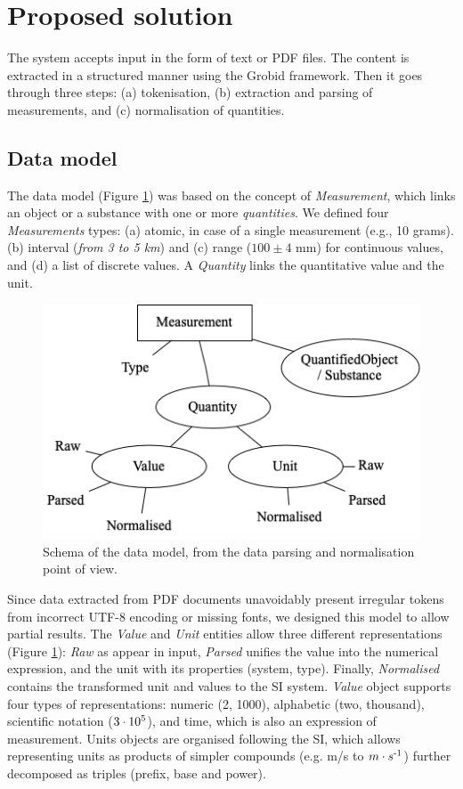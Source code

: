 \section{Proposed solution}
\label{sec:system}

The system accepts input in the form of text or PDF files. 
The content is extracted in a structured manner using the Grobid framework. 
Then it goes through three steps: (a) tokenisation, (b) extraction and parsing of measurements, and (c) normalisation of quantities.

\subsection{Data model}
\label{subsec:data-model}

The data model (Figure \ref{fig:data-model-schema-2}) was based on the concept of \textit{Measurement}, which links an object or a substance with one or more \textit{quantities}. 
We defined four \textit{Measurements} types: (a) atomic, in case of a single measurement (e.g., 10 grams). (b) interval (\textit{from 3 to 5 km}) and (c) range ($100 \pm 4$ mm) for continuous values, and (d) a list of discrete values. A \textit{Quantity} links the quantitative value and the unit. 

\label{subsub:data-model}
\begin{figure}[htbp]
  \centering
  \includegraphics[width=0.8\linewidth]{figures/quantities/schema-2.png}
  \caption{Schema of the data model, from the data parsing and normalisation point of view.}
  \label{fig:data-model-schema-2}
\end{figure}

Since data extracted from PDF documents unavoidably present irregular tokens from incorrect UTF-8 encoding or missing fonts, we designed this model to allow partial results. 
The \textit{Value} and \textit{Unit} entities allow three different representations (Figure \ref{fig:data-model-schema-2}): \textit{Raw} as appear in input, \textit{Parsed} unifies the value into the numerical expression, and the unit with its properties (system, type). Finally, \textit{Normalised} contains the transformed unit and values to the SI system. \textit{Value} object supports four types of representations: numeric (2, 1000), alphabetic (two, thousand), scientific notation ($3\cdot10\textsuperscript{5}$), and time, which is also an expression of measurement. Units objects are organised following the SI, which allows representing units as products of simpler compounds (e.g. m/s to $m \cdot s\textsuperscript{-1}$) further decomposed as triples (prefix, base and power).

